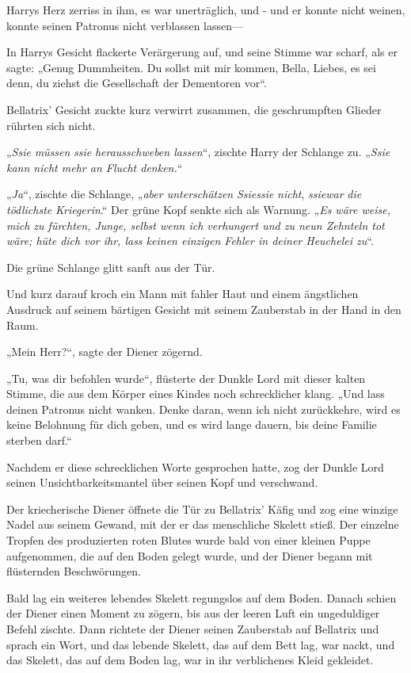 {Harrys Herz zerriss in ihm, es war unerträglich, und - und er konnte nicht weinen, konnte seinen Patronus nicht verblassen lassen—

In Harrys Gesicht flackerte Verärgerung auf, und seine Stimme war scharf, als er sagte: „Genug Dummheiten. Du sollst mit mir kommen, Bella, Liebes, es sei denn, du ziehst die Gesellschaft der Dementoren vor“.

Bellatrix' Gesicht zuckte kurz verwirrt zusammen, die geschrumpften Glieder rührten sich nicht.

„\emph{Ssie} \emph{müssen} \emph{ssie} \emph{herausschweben lassen}“, zischte Harry der Schlange zu. „\emph{Ssie} \emph{kann nicht mehr an Flucht denken.}“

„\emph{Ja}“, zischte die Schlange, „\emph{aber unterschätzen} \emph{Ssiessie} \emph{nicht}, \emph{ssiewar} \emph{die tödlichste} \emph{Kriegerin}.“ Der grüne Kopf senkte sich als Warnung. „\emph{Es wäre weise, mich zu fürchten, Junge, selbst wenn ich verhungert und zu neun Zehnteln tot wäre; hüte dich vor ihr, lass keinen einzigen Fehler in deiner Heuchelei zu}“.

Die grüne Schlange glitt sanft aus der Tür.

Und kurz darauf kroch ein Mann mit fahler Haut und einem ängstlichen Ausdruck auf seinem bärtigen Gesicht mit seinem Zauberstab in der Hand in den Raum.

„Mein Herr?“, sagte der Diener zögernd.

„Tu, was dir befohlen wurde“, flüsterte der Dunkle Lord mit dieser kalten Stimme, die aus dem Körper eines Kindes noch schrecklicher klang. „Und lass deinen Patronus nicht wanken. Denke daran, wenn ich nicht zurückkehre, wird es keine Belohnung für dich geben, und es wird lange dauern, bis deine Familie sterben darf.“

Nachdem er diese schrecklichen Worte gesprochen hatte, zog der Dunkle Lord seinen Unsichtbarkeitsmantel über seinen Kopf und verschwand.

Der kriecherische Diener öffnete die Tür zu Bellatrix' Käfig und zog eine winzige Nadel aus seinem Gewand, mit der er das menschliche Skelett stieß. Der einzelne Tropfen des produzierten roten Blutes wurde bald von einer kleinen Puppe aufgenommen, die auf den Boden gelegt wurde, und der Diener begann mit flüsternden Beschwörungen.

Bald lag ein weiteres lebendes Skelett regungslos auf dem Boden. Danach schien der Diener einen Moment zu zögern, bis aus der leeren Luft ein ungeduldiger Befehl zischte. Dann richtete der Diener seinen Zauberstab auf Bellatrix und sprach ein Wort, und das lebende Skelett, das auf dem Bett lag, war nackt, und das Skelett, das auf dem Boden lag, war in ihr verblichenes Kleid gekleidet.

}
